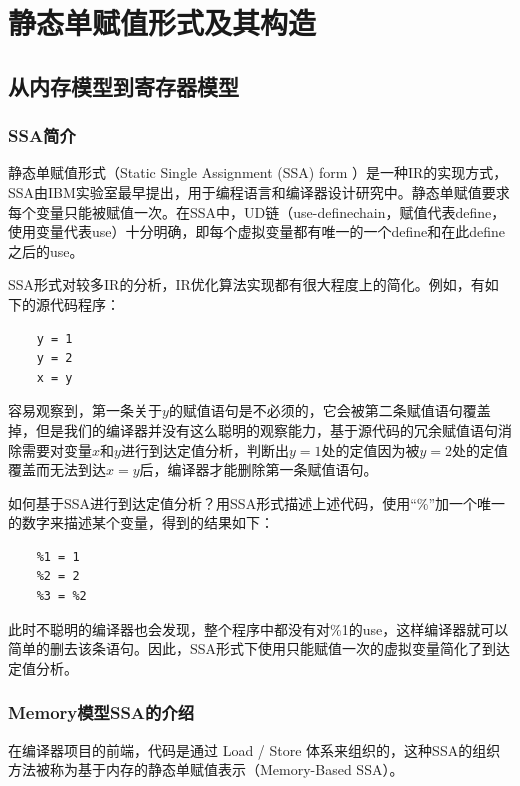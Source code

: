 
\chapter{静态单赋值形式及其构造}
\section{从内存模型到寄存器模型}

\subsection{SSA简介}
静态单赋值形式（Static Single Assignment (SSA) form ）是一种IR的实现方式，SSA由IBM实验室最早提出\cite{10.1145/73560.73562}，用于编程语言和编译器设计研究中。静态单赋值要求每个变量只能被赋值一次。在SSA中，UD链（use-definechain，赋值代表define，使用变量代表use）十分明确，即每个虚拟变量都有唯一的一个define和在此define之后的use。

SSA形式对较多IR的分析，IR优化算法实现都有很大程度上的简化。例如，有如下的源代码程序：

\begin{verbatim}
    y = 1
    y = 2
    x = y
\end{verbatim}

容易观察到，第一条关于$y$的赋值语句是不必须的，它会被第二条赋值语句覆盖掉，但是我们的编译器并没有这么聪明的观察能力，基于源代码的冗余赋值语句消除需要对变量$x$和$y$进行到达定值分析，判断出$y=1$处的定值因为被$y=2$处的定值覆盖而无法到达$x=y$后，编译器才能删除第一条赋值语句。

如何基于SSA进行到达定值分析？用SSA形式描述上述代码，使用“\%”加一个唯一的数字来描述某个变量，得到的结果如下：

\begin{verbatim}
    %1 = 1
    %2 = 2
    %3 = %2
\end{verbatim}

此时不聪明的编译器也会发现，整个程序中都没有对\%1的use，这样编译器就可以简单的删去该条语句。因此，SSA形式下使用只能赋值一次的虚拟变量简化了到达定值分析。

\subsection{Memory模型SSA的介绍}

在编译器项目的前端，代码是通过 Load / Store 体系来组织的，这种SSA的组织方法被称为基于内存的静态单赋值表示（Memory-Based SSA）。

